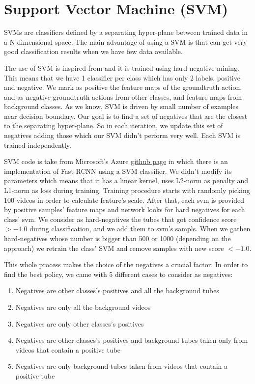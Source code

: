 \documentclass{report}
\begin{document}
\section{Support Vector Machine (SVM)}
SVMs are classifiers defined by a separating hyper-plane between trained data in a N-dimensional space. The main advantage of using a SVM
is that can get very good classification results when we have few data available. \par
The use of SVM is inspired from \cite{Girshick:2015:FR:2919332.2920125} and it is trained using hard negative mining. 
This means that we have 1 classifier per class which has only 2 labels, positive and negative. We mark as positive the feature maps of the
groundtruth action, and as negative groundtruth actions from other classes, and feature maps from background classes.
As we know, SVM is driven by small number of examples near decision boundary. Our goal is to find a set of negatives that are the closest to
the separating hyper-plane. So in each iteration, we update this set of negatives adding those which our SVM didn't perform very well. Each
SVM is trained independently. \par
SVM code is take from Microsoft's Azure \href{https://github.com/Azure/ObjectDetectionUsingCntk} {github page} in which there is an implementation
of Fast RCNN using a SVM classifier. We didn't modify its parameters which means that it has a linear kernel, uses  L2-norm as penalty and L1-norm
as loss during training. Training procedure starts with randomly picking 100 videos in order to calculate feature's scale.
After that, each svm is provided by positive samples' feature maps and network looks for hard negatives for each class' svm. We consider as hard-negatives the tubes
that got confidence score $ >  -1.0 $ during classification, and we add them to svm's sampls. When we gathen  hard-negatives whose number is bigger than 500 or 1000 (depending
on the approach) we retrain the class' SVM and remove samples with new score $ < -1.0$.  \par 
This whole process makes the choice of the negatives a crucial factor. In order to find the best policy,  we came with 5 different cases to consider
as negatives:
\begin{enumerate}
\item Negatives are other classes's positives and all the background tubes
\item Negatives are only all the background videos
\item Negatives are only other classes's positives
\item Negatives are other classes's positives and background tubes taken only from videos that contain a positive tube
\item Negatives are only background tubes taken from videos that contain a positive tube
\end{enumerate}
\end{document}
